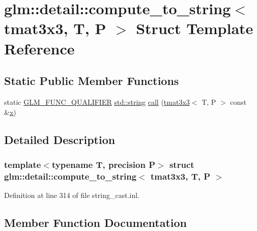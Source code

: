 \hypertarget{structglm_1_1detail_1_1compute__to__string_3_01tmat3x3_00_01_t_00_01_p_01_4}{}\section{glm\+::detail\+::compute\+\_\+to\+\_\+string$<$ tmat3x3, T, P $>$ Struct Template Reference}
\label{structglm_1_1detail_1_1compute__to__string_3_01tmat3x3_00_01_t_00_01_p_01_4}
\subsection*{Static Public Member Functions}
\begin{DoxyCompactItemize}
\item 
static \mbox{\hyperlink{setup_8hpp_a33fdea6f91c5f834105f7415e2a64407}{G\+L\+M\+\_\+\+F\+U\+N\+C\+\_\+\+Q\+U\+A\+L\+I\+F\+I\+ER}} \mbox{\hyperlink{glad_8h_ac83513893df92266f79a515488701770}{std\+::string}} \mbox{\hyperlink{structglm_1_1detail_1_1compute__to__string_3_01tmat3x3_00_01_t_00_01_p_01_4_a30955bc053389846e9f0a7a7154babb7}{call}} (\mbox{\hyperlink{structglm_1_1tmat3x3}{tmat3x3}}$<$ T, P $>$ const \&\mbox{\hyperlink{glad_8h_a92d0386e5c19fb81ea88c9f99644ab1d}{x}})
\end{DoxyCompactItemize}


\subsection{Detailed Description}
\subsubsection*{template$<$typename T, precision P$>$\newline
struct glm\+::detail\+::compute\+\_\+to\+\_\+string$<$ tmat3x3, T, P $>$}



Definition at line 314 of file string\+\_\+cast.\+inl.



\subsection{Member Function Documentation}
\mbox{\label{structglm_1_1detail_1_1compute__to__string_3_01tmat3x3_00_01_t_00_01_p_01_4_a30955bc053389846e9f0a7a7154babb7}} 
